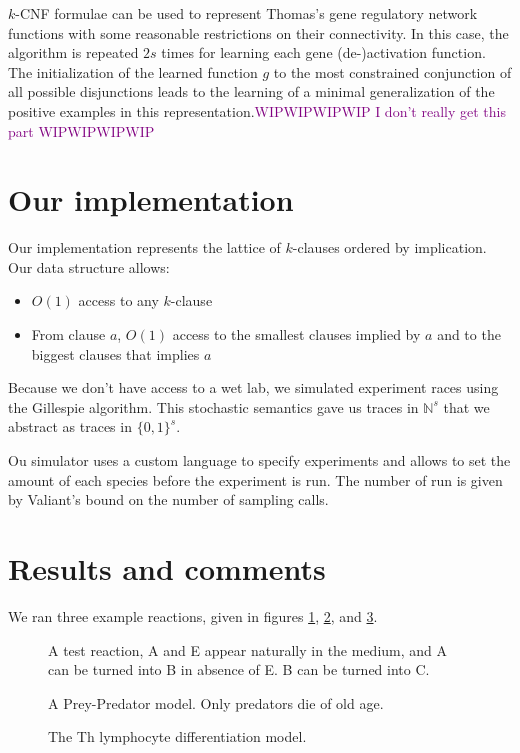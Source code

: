 \documentclass{llncs}
\newcommand{\wip}[1]{\textcolor{Purple}{WIPWIPWIPWIP #1 WIPWIPWIPWIP}}
\begin{document}
$k$-CNF formulae can be used to represent Thomas's gene regulatory network functions with some reasonable restrictions on their connectivity.
In this case, the algorithm is repeated $2s$ times for learning each gene (de-)activation function.
The initialization of the learned function $g$ to the most constrained conjunction of all possible disjunctions
leads to the learning of a minimal generalization of the positive examples in this representation.\wip{I don't really get this part}

\section{Our implementation}
Our implementation represents the lattice of $k$-clauses ordered by implication. Our data structure allows:
\begin{itemize}
	\item $O(1)$ access to any $k$-clause
	\item From clause $a$, $O(1)$ access to the smallest clauses implied by $a$ and to the biggest clauses that implies $a$
\end{itemize}

Because we don't have access to a wet lab, we simulated experiment races using the Gillespie algorithm. This stochastic semantics gave us traces in $\mathbb{N}^s$ that we abstract as traces in $\{0,1\}^s$.

Ou simulator uses a custom language to specify experiments and allows to set the amount of each species before the experiment is run. The number of run is given by Valiant's bound on the number of sampling calls.


\section{Results and comments}

We ran three example reactions, given in figures \ref{test}, \ref{preypred}, and \ref{lympho}.
\begin{figure}[htbp]
	
	\vspace{-1em}
	\caption{A test reaction, A and E appear naturally in the medium, and A can be turned into B in absence of E. B  can be turned into C.\label{test}}
\end{figure}
\begin{figure}[htbp]
	
	\vspace{-1em}
	\caption{A Prey-Predator model. Only predators die of old age.\label{preypred}}
\end{figure}
\begin{figure}[htbp]
	
	\vspace{-1em}
	\caption{The Th lymphocyte differentiation model.\label{lympho}}
\end{figure}
\end{document}
